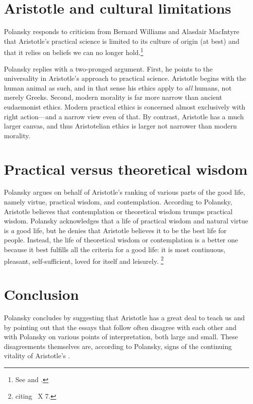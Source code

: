 \section*{Aristotle and cultural limitations}

Polansky responds to criticism from Bernard Williams and Alasdair
MacIntyre that Aristotle's practical science is limited to its culture of
origin (at best) and that it relies on beliefs we can no longer
hold.\footnote{See \citet{williams1985} and \citet{macintyre2007}.}

Polansky replies with a two-pronged argument.  First, he points to the
universality in Aristotle's approach to practical science.  Aristotle
begins with the human animal as such, and in that sense his ethics apply to
\emph{all} humans, not merely Greeks.  Second, modern morality is far more
narrow than ancient eudaemonist ethics.  Modern practical ethics is
concerned almost exclusively with right action---and a narrow view even of
that.  By contrast, Aristotle has a much larger canvas, and thus
Aristotelian ethics is larger not narrower than modern morality.

\section*{Practical versus theoretical wisdom}

Polansky argues on behalf of Aristotle's ranking of various parts of the
good life, namely virtue, practical wisdom, and contemplation.  According
to Polansky, Aristotle believes that contemplation or theoretical wisdom
trumps practical wisdom.  Polansky acknowledges that a life of practical
wisdom and natural virtue is \emph{a} good life, but he denies that
Aristotle believes it to be the best life for people.  Instead, the life of
theoretical wisdom or contemplation is a better one because it best
fulfills all the criteria for a good life: it is most continuous, pleasant,
self-sufficient, loved for itself and leisurely.%
\footnote{\citet[12]{polansky2014a} citing \NE\ X 7.}

\section*{Conclusion}

Polansky concludes by suggesting that Aristotle has a great deal to teach
us and by pointing out that the essays that follow often disagree with each
other and with Polansky on various points of interpretation, both large and
small.  These disagreements themselves are, according to Polansky, signs of
the continuing vitality of Aristotle's \NE.
